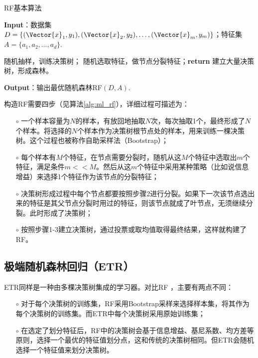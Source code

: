 \begin{algorithm}[!htbp]
  \small
  \caption{RF基本算法}\label{alg:ml_rf}
  \textbf{Input}：{数据集$D=\{(\Vector{x}_1,y_1),(\Vector{x}_2,y_2),\ldots,(\Vector{x}_m,y_m)\}$；特征集$A=\{a_1,a_2,\ldots,a_d\}$.}
  \begin{algorithmic}[1]
    \State 随机抽样，训练决策树；
      \State 随机选取特征，做节点分裂特征；\textbf{return}
    \EndWhile
    \State 建立大量决策树，形成森林。
    \EndProcedure
  \end{algorithmic}
  \textbf{Output}：{输出最优随机森林RF$(D,A)$.}
\end{algorithm}

构造RF需要四步（见算法\ref{alg:ml_rf}），详细过程可描述为：
\begin{enumerate}
  \item[$\circ$] 一个样本容量为$N$的样本，有放回地抽取$N$次，每次抽取1个，最终形成了$N$个样本。将选择的$N$个样本作为决策树根节点处的样本，用来训练一棵决策树。这个过程也被称作自助采样法（Bootstrap）；
  \item[$\circ$] 每个样本有$M$个特征，在节点需要分裂时，随机从这$M$个特征中选取出$m$个特征，满足条件$m<<M$。然后从这$m$个特征中采用某种策略（比如说信息增益）来选择1个特征作为该节点的分裂特征；
  \item[$\circ$] 决策树形成过程中每个节点都要按照步骤2进行分裂。如果下一次该节点选出来的特征是其父节点分裂时用过的特征，则该节点就成了叶节点，无须继续分裂。此时形成了决策树；
  \item[$\circ$] 按照步骤1-3建立决策树，通过投票或取均值取得最终结果，这样就构建了RF。
\end{enumerate}

\subsection{极端随机森林回归（ETR）}\label{sec:ml_etr}

ETR同样是一种由多棵决策树集成的学习器。对比RF                                                                                                                                ，主要有两点不同：
\begin{enumerate}
  \item[$\circ$] 对于每个决策树的训练集，RF采用Bootstrap采样来选择样本集，将其作为每个决策树的训练集。而ETR中每个决策树采用原始训练集；
  \item[$\circ$] 在选定了划分特征后，RF中的决策树会基于信息增益、基尼系数、均方差等原则，选择一个最优的特征值划分点，这和传统的决策树相同。但ETR会随机选择一个特征值来划分决策树。
\end{enumerate}

